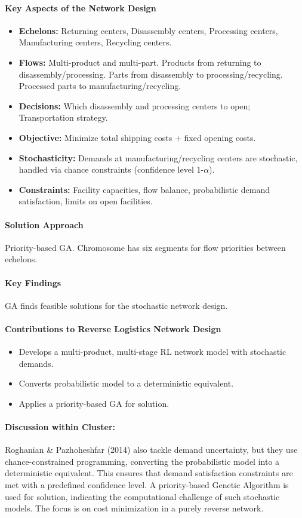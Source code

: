 \paragraph{Key Aspects of the Network Design}
\begin{itemize}
    \item \textbf{Echelons:} Returning centers, Disassembly centers, Processing centers, Manufacturing centers, Recycling centers.
    \item \textbf{Flows:} Multi-product and multi-part. Products from returning to disassembly/processing. Parts from disassembly to processing/recycling. Processed parts to manufacturing/recycling.
    \item \textbf{Decisions:} Which disassembly and processing centers to open; Transportation strategy.
    \item \textbf{Objective:} Minimize total shipping costs + fixed opening costs.
    \item \textbf{Stochasticity:} Demands at manufacturing/recycling centers are stochastic, handled via chance constraints (confidence level 1-$\alpha$).
    \item \textbf{Constraints:} Facility capacities, flow balance, probabilistic demand satisfaction, limits on open facilities.
\end{itemize}
\paragraph{Solution Approach} Priority-based GA. Chromosome has six segments for flow priorities between echelons.
\paragraph{Key Findings} GA finds feasible solutions for the stochastic network design.
\paragraph{Contributions to Reverse Logistics Network Design}
\begin{itemize}
    \item Develops a multi-product, multi-stage RL network model with stochastic demands.
    \item Converts probabilistic model to a deterministic equivalent.
    \item Applies a priority-based GA for solution.
\end{itemize}
\paragraph{Discussion within Cluster:} Roghanian \& Pazhoheshfar (2014) also tackle demand uncertainty, but they use chance-constrained programming, converting the probabilistic model into a deterministic equivalent. This ensures that demand satisfaction constraints are met with a predefined confidence level. A priority-based Genetic Algorithm is used for solution, indicating the computational challenge of such stochastic models. The focus is on cost minimization in a purely reverse network.


